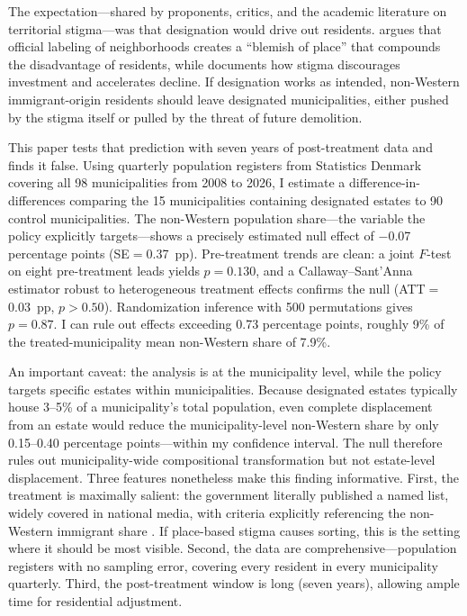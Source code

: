 \documentclass[12pt]{article}
\begin{document}
The expectation---shared by proponents, critics, and the academic literature on territorial stigma---was that designation would drive out residents. \citet{wacquant2007territorial} argues that official labeling of neighborhoods creates a ``blemish of place'' that compounds the disadvantage of residents, while \citet{slater2021shaking} documents how stigma discourages investment and accelerates decline. If designation works as intended, non-Western immigrant-origin residents should leave designated municipalities, either pushed by the stigma itself or pulled by the threat of future demolition.

This paper tests that prediction with seven years of post-treatment data and finds it false. Using quarterly population registers from Statistics Denmark covering all 98 municipalities from 2008 to 2026, I estimate a difference-in-differences comparing the 15 municipalities containing designated estates to 90 control municipalities. The non-Western population share---the variable the policy explicitly targets---shows a precisely estimated null effect of $-$0.07 percentage points (SE$=$0.37~pp). Pre-treatment trends are clean: a joint $F$-test on eight pre-treatment leads yields $p=0.130$, and a Callaway--Sant'Anna estimator robust to heterogeneous treatment effects confirms the null (ATT$=$0.03~pp, $p>0.50$). Randomization inference with 500 permutations gives $p=0.87$. I can rule out effects exceeding 0.73 percentage points, roughly 9\% of the treated-municipality mean non-Western share of 7.9\%.

An important caveat: the analysis is at the municipality level, while the policy targets specific estates within municipalities. Because designated estates typically house 3--5\% of a municipality's total population, even complete displacement from an estate would reduce the municipality-level non-Western share by only 0.15--0.40 percentage points---within my confidence interval. The null therefore rules out municipality-wide compositional transformation but not estate-level displacement. Three features nonetheless make this finding informative. First, the treatment is maximally salient: the government literally published a named list, widely covered in national media, with criteria explicitly referencing the non-Western immigrant share \citep{seemann2021danish}. If place-based stigma causes sorting, this is the setting where it should be most visible. Second, the data are comprehensive---population registers with no sampling error, covering every resident in every municipality quarterly. Third, the post-treatment window is long (seven years), allowing ample time for residential adjustment.
\end{document}
